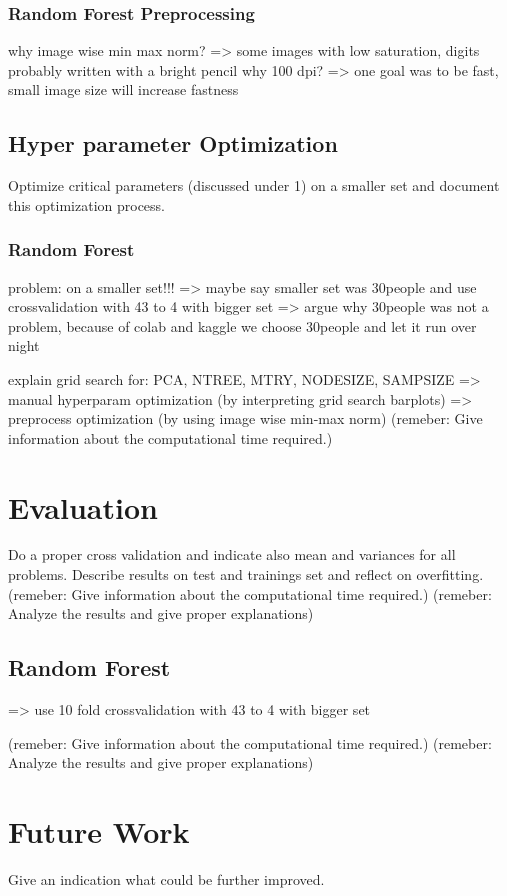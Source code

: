 \documentclass[conference]{IEEEtran}
\begin{document}
\subsubsection{Random Forest Preprocessing}
why image wise min max norm? => some images with low saturation, digits probably written with a bright pencil
why 100 dpi? => one goal was to be fast, small image size will increase fastness

\subsection{Hyper parameter Optimization}
Optimize critical parameters (discussed under 1) on a smaller set and document this optimization process.

\subsubsection{Random Forest}
problem: on a smaller set!!! => maybe say smaller set was 30people and use crossvalidation with 43 to 4 with bigger set => argue why 30people was not a problem, because of colab and kaggle we choose 30people and let it run over night

explain grid search for: PCA, NTREE, MTRY, NODESIZE, SAMPSIZE
=> manual hyperparam optimization (by interpreting grid search barplots)
=> preprocess optimization (by using image wise min-max norm)
(remeber: Give information about the computational time required.)


\section{Evaluation}
Do a proper cross validation and indicate also mean and variances for all problems. Describe results on test and trainings set and reflect on overfitting. 
(remeber: Give information about the computational time required.)
(remeber: Analyze the results and give proper explanations)




\subsection{Random Forest}
=> use 10 fold crossvalidation with 43 to 4 with bigger set

(remeber: Give information about the computational time required.)
(remeber: Analyze the results and give proper explanations)
\section{Future Work}
Give an indication what could be further improved. 


\begin{thebibliography}{00}
\end{thebibliography}
\end{document}
